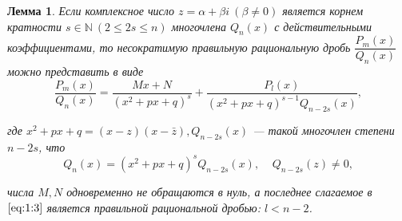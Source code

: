 \documentclass[12pt]{report}
\numberwithin{equation}{section}
\newtheorem{lemma}{Лемма}[section]
\begin{document}
\begin{lemma} \label{lemm:1:2}
Если комплексное число $z = \alpha + \beta i~(\beta \neq 0)$ является корнем кратности $s \in \mathbb{N}~(2 \leqslant 2s \leqslant n) $ многочлена $Q_n(x)$ с действительными коэффициентами, то несократимую правильную рациональную дробь $\dfrac{P_m(x)}{Q_n(x)}$ можно представить в виде
\begin{equation}
\frac{P_m(x)}{Q_n(x)} = \frac{Mx + N}{(x^2 + px + q)^s} + \frac{P_l(x)}{(x^2 + px + q)^{s-1} Q_{n-2s}(x)}, \label{eq:1:3}
\end{equation}

где $x^2 + px + q = (x-z)(x-\bar{z}), Q_{n-2s}(x)$ --- такой многочлен степени $n- 2s$, что
\[ Q_n(x) = (x^2 + px + q)^s Q_{n-2s}(x),~~~~~Q_{n-2s}(z) \neq 0, \]

числа $M, N$ одновременно не обращаются в нуль, а последнее слагаемое в $\eqref{eq:1:3}$ является правильной рациональной дробью: $l < n - 2$.
\end{lemma}
\end{document}
